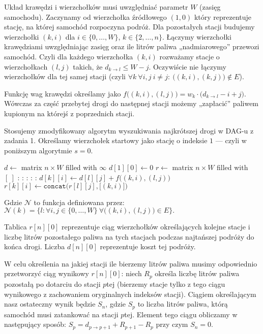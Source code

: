\documentclass[14pt]{article}
\begin{document}
Układ krawędzi i wierzchołków musi uwzględniać parametr $W$ (zasięg samochodu).
Zaczynamy od wierzchołka źródłowego $(1,0)$ który reprezentuje stację, na której samochód rozpoczyna podróż. Dla pozostałych stacji budujemy wierzchołki $(k,i)$ dla $i\in\{0,\dots,W\}$, $k\in\{2,\dots,n\}$.
Łączymy wierzchołki krawędziami uwzględniając zasięg oraz ile litrów paliwa „nadmiarowego” przewozi samochód. Czyli dla każdego wierzchołka $(k,i)$ rozważamy stacje o wierzchołkach $(l,j)$ takich, że $d_{k\to l} \le W - j$. Oczywiście nie łączymy wierzchołków dla tej samej stacji (czyli $\forall k~ \forall i,j~i\neq j:~ \big((k,i),(k,j)\big) \notin E$).

Funkcję wag krawędzi określamy jako $f\big((k,i),(l,j)\big)=w_k\cdot\big(d_{k\to l} - i + j \big)$. Wówczas za część przebytej drogi do następnej stacji możemy „zapłacić” paliwem kupionym na którejś z poprzednich stacji.

Stosujemy zmodyfikowany algorytm wyszukiwania najkrótszej drogi w DAG-u z zadania 1. Określamy wierzchołek startowy jako stację o indeksie $1$ — czyli w poniższym algorytmie $s = 0$.

\begin{algorithm}[H]
  \begin{algorithmic}[1]
    \State $d \gets$ matrix $n \times W$ filled with $\infty$
    \State $d[1][0] \gets 0$
    \State $r \gets$ matrix $n \times W$ filled with $[~]$
    :
      :
        :
          :
            :
              \State $d[k][i] \gets d[l][j] + f\big((k,i),(l,j)\big)$
              \State $r[k][i] \gets \texttt{concat}\Big(r[l][j], \big[ (k,i) \big]\Big)$
            \EndIf
          \EndFor
        \EndFor
      \EndFor
    \EndFor
  \end{algorithmic}
\end{algorithm}
Gdzie $\mathcal{N}$ to funkcja definiowana przez:
$\mathcal{N}(k) = \{l: \forall i,j\in\{0,\dots,W\}~ \forall \big((k,i),(l,j)\big) \in E\}.$

Tablica $r[n][0]$ reprezentuje ciąg wierzchołków określających kolejne stacje i liczbę litrów pozostałego paliwa na tych stacjach podczas najtańszej podróży do końca drogi. Liczba $d[n][0]$ reprezentuje koszt tej podróży.

W celu określenia na jakiej stacji ile bierzemy litrów paliwa musimy odpowiednio przetworzyć ciąg wynikowy $r[n][0]$: niech $R_p$ określa liczbę litrów paliwa pozostałą po dotarciu do stacji $p$tej (bierzemy stacje tylko z tego ciągu wynikowego z zachowaniem oryginalnych indeksów stacji).
Ciągiem określającym nasz ostateczny wynik będzie $S_n$, gdzie $S_p$ to liczba litrów paliwa, którą samochód musi zatankować na stacji $p$tej. Element tego ciągu obliczamy w następujący sposób: $S_p = d_{p\to p+1} + R_{p+1} - R_p$ przy czym $S_n = 0$.
\end{document}
